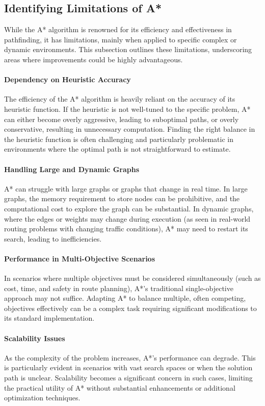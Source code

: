 \documentclass{article}
\begin{document}
\subsection{Identifying Limitations of A*}

While the A* algorithm is renowned for its efficiency and effectiveness in pathfinding, it has limitations, mainly when applied to specific complex or dynamic environments. This subsection outlines these limitations, underscoring areas where improvements could be highly advantageous.

\paragraph{Dependency on Heuristic Accuracy}
The efficiency of the A* algorithm is heavily reliant on the accuracy of its heuristic function. If the heuristic is not well-tuned to the specific problem, A* can either become overly aggressive, leading to suboptimal paths, or overly conservative, resulting in unnecessary computation. Finding the right balance in the heuristic function is often challenging and particularly problematic in environments where the optimal path is not straightforward to estimate.

\paragraph{Handling Large and Dynamic Graphs}
A* can struggle with large graphs or graphs that change in real time. In large graphs, the memory requirement to store nodes can be prohibitive, and the computational cost to explore the graph can be substantial. In dynamic graphs, where the edges or weights may change during execution (as seen in real-world routing problems with changing traffic conditions), A* may need to restart its search, leading to inefficiencies.

\paragraph{Performance in Multi-Objective Scenarios}
In scenarios where multiple objectives must be considered simultaneously (such as cost, time, and safety in route planning), A*'s traditional single-objective approach may not suffice. Adapting A* to balance multiple, often competing, objectives effectively can be a complex task requiring significant modifications to its standard implementation.

\paragraph{Scalability Issues}
As the complexity of the problem increases, A*'s performance can degrade. This is particularly evident in scenarios with vast search spaces or when the solution path is unclear. Scalability becomes a significant concern in such cases, limiting the practical utility of A* without substantial enhancements or additional optimization techniques.
\end{document}

